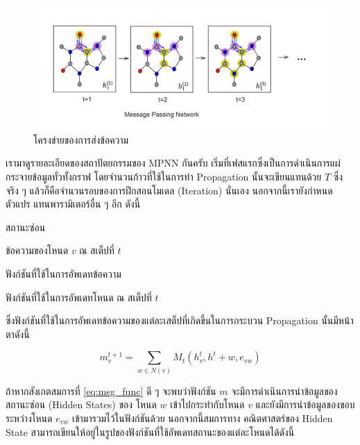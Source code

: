 \begin{figure}[htbp]
    \centering
    \includegraphics[width=\linewidth]{fig/mp-network.png}
    \caption{โครงข่ายของการส่งข้อความ}
    \label{fig:mp_network}
\end{figure}

เรามาดูรายละเอียดของสถาปัตยกรรมของ MPNN กันครับ เริ่มที่เฟสแรกซึ่งเป็นการดำเนินการแผ่กระจายข้อมูลทั่วทั้งกราฟ โดยจำนวนก้าวที่ใช้ในการทำ 
Propagation นั้นจะเขียนแทนด้วย $T$ ซึ่งจริง ๆ แล้วก็คือจำนวนรอบของการฝึกสอนโมเดล (Iteration) นั่นเอง นอกจากนี้เรายังกำหนดตัวแปร%
แทนพารามิเตอร์อื่น ๆ อีก ดังนี้

\begin{description}[font=$\bullet$,labelindent=2em,labelwidth=2cm,labelsep=0em]
    \item[\ $h$] สถานะซ่อน
    
    \item[\ $m^{t}_{v}$] ข้อความของโหนด $v$ ณ สเต็ปที่ $t$
    
    \item[\ $M$] ฟังก์ชันที่ใช้ในการอัพเดทข้อความ
    
    \item[\ $U_{t}$] ฟังก์ชันที่ใช้ในการอัพเดทโหนด ณ สเต็ปที่ $t$    
\end{description}

\noindent ซึ่งฟังก์ชันที่ใช้ในการอัพเดทข้อความของแต่ละเสต็ปที่เกิดขึ้นในการกระบวน Propagation นั้นมีหน้าตาดังนี้

\begin{equation}\label{eq:msg_func}
    m^{t+1}_{v} = \sum_{w \in N(v)} M_{t} (h^{t}_{v}, h^{t}+{w}, e_{vw})
\end{equation}

ถ้าหากสังเกตสมการที่ \ref{eq:msg_func} ดี ๆ จะพบว่าฟังก์ชัน $m$ จะมีการดำเนินการนำข้อมูลของสถานะซ่อน (Hidden States) ของ%
โหนด $w$ เข้าไปกระทำกับโหนด $v$ และยังมีการนำข้อมูลของขอบระหว่างโหนด $e_{vw}$ เข้ามารวมไว้ในฟังก์ชันด้วย นอกจากนี้สมการทาง%
คณิตศาสตร์ของ Hidden State สามารถเขียนให้อยู่ในรูปของฟังก์ชันที่ใช้อัพเดทสถานะของแต่ละโหนดได้ดังนี้ 

